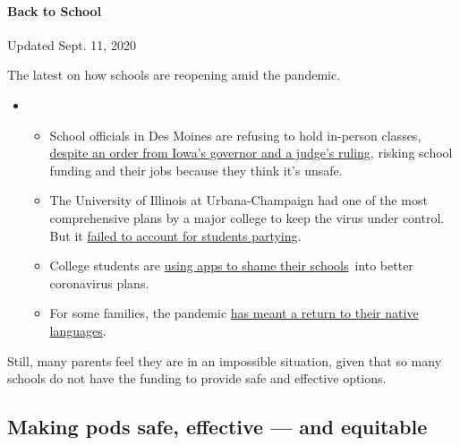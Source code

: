\hypertarget{back-to-school}{%
\paragraph{Back to School}\label{back-to-school}}

Updated Sept. 11, 2020

The latest on how schools are reopening amid the pandemic.

\begin{itemize}
\item
  \begin{itemize}
  \tightlist
  \item
    School officials in Des Moines are refusing to hold in-person
    classes,
    \href{https://www.nytimes3xbfgragh.onion/2020/09/10/us/des-moines-school-opening-coronavirus.html?action=click\&pgtype=Article\&state=default\&region=MAIN_CONTENT_3\&context=storylines_keepup}{despite
    an order from Iowa's governor and a judge's ruling}, risking school
    funding and their jobs because they think it's unsafe.
  \item
    The University of Illinois at Urbana-Champaign had one of the most
    comprehensive plans by a major college to keep the virus under
    control. But it
    \href{https://www.nytimes3xbfgragh.onion/2020/09/10/health/university-illinois-covid.html?action=click\&pgtype=Article\&state=default\&region=MAIN_CONTENT_3\&context=storylines_keepup}{failed
    to account for students partying}.
  \item
    College students are
    \href{https://www.nytimes3xbfgragh.onion/2020/09/10/technology/coronavirus-quarantines-college.html?action=click\&pgtype=Article\&state=default\&region=MAIN_CONTENT_3\&context=storylines_keepup}{using
    apps to shame their schools}~into better coronavirus plans.
  \item
    For some families, the pandemic
    \href{https://www.nytimes3xbfgragh.onion/2020/09/10/parenting/family-second-language-coronavirus.html?action=click\&pgtype=Article\&state=default\&region=MAIN_CONTENT_3\&context=storylines_keepup}{has
    meant a return to their native languages}.
  \end{itemize}
\end{itemize}

Still, many parents feel they are in an impossible situation, given that
so many schools do not have the funding to provide safe and effective
options.

\hypertarget{making-pods-safe-effective--and-equitable}{%
\subsection{Making pods safe, effective --- and
equitable}\label{making-pods-safe-effective--and-equitable}}

